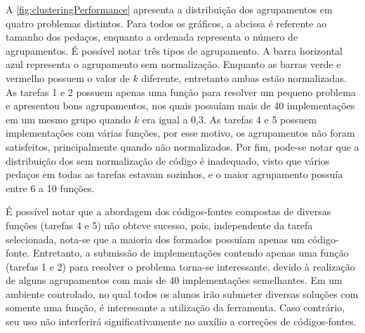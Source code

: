 		A \cref{fig:clusteringPerformance} apresenta a distribuição dos
		agrupamentos em quatro problemas distintos. Para todos os gráficos, a
		abcissa é referente ao tamanho dos pedaços, enquanto a ordenada representa
		o número de agrupamentos. É possível notar três tipos de agrupamento. A barra
		horizontal azul representa o agrupamento sem normalização. Enquanto as barras
		verde e vermelho possuem o valor de $k$ diferente, entretanto ambas estão
		normalizadas. As tarefas 1 e 2 possuem apenas uma função para resolver um
		pequeno problema e apresentou bons agrupamentos, nos quais possuíam mais
		de 40 implementações em um mesmo grupo quando $k$ era igual a 0,3. As
		tarefas 4 e 5 possuem implementações com várias funções, por esse motivo,
		os agrupamentos não foram satisfeitos, principalmente quando não normalizados.
		Por fim, pode-se notar que a distribuição dos  sem normalização
		de código é inadequado, visto que vários pedaços em todas as tarefas estavam
		sozinhos, e o maior agrupamento possuía entre 6 a 10 funções.
		
		É possível notar que a abordagem dos códigos-fontes compostas de diversas
		funções (tarefas 4 e 5) não obteve sucesso, pois, independente da tarefa
		selecionada, nota-se que a maioria dos  formados possuíam
		apenas um código-fonte. Entretanto, a submissão de implementações contendo
		apenas uma função (tarefas 1 e 2) para resolver o problema torna-se interessante,
		devido à realização de alguns agrupamentos com mais de 40 implementações
		semelhantes. Em um ambiente controlado, no qual todos os alunos irão submeter
		diversas soluções com somente uma função, é interessante a utilização da
		ferramenta. Caso contrário, seu uso não interferirá significativamente no
		auxílio a correções de códigos-fontes. 
		
